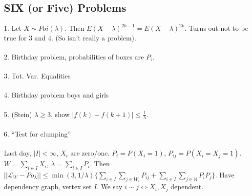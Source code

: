 \documentclass[12pt]{article}
\begin{document}
\subsection{SIX (or Five) Problems}
1.  Let $X \sim Poi(\lambda)$.  Then $E(X - \lambda)^{2k-1} = E(X - \lambda)^{2k}$.  Turns out not to be true for 3 and 4. (So isn't really a problem).
\\ \\
2.  Birthday problem, probabilities of boxes are $P_i$.
\\ \\
3.  Tot. Var. Equalities
\\ \\
4.  Birthday problem boys and girls
\\ \\
5.  (Stein) $\lambda \ge 3$, show $|f(k) - f(k+1)| \le \frac{1}{\lambda}$.
\\ \\
6.  ``Test for clumping''
\\ \\
Last day, $|I| < \infty$, $X_i$ are zero/one.  $P_i = P(X_i = 1)$, $P_{ij} = P(X_i = X_j = 1)$.  $W = \sum_{i \in I} X_i$, $\lambda = \sum_{i \in I} P_i$.  Then $|| \mathcal{L}_W - Po_\lambda || \le \min(3, 1/\lambda) \{  \sum_{i \in I} \sum_{j \in W_i} P_{ij} + \sum_{i \in I} \sum_{j \in \mathbb{N}} P_i P_j \}$.  Have dependency graph, vertex set $I$.  We say $i \sim j \Leftrightarrow X_i, X_j$ dependent.
\\ \\
\end{document}
